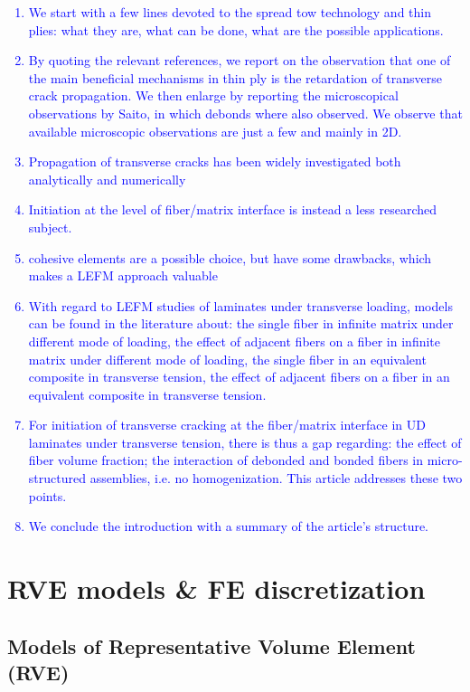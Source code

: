\documentclass[review]{elsarticle}
\begin{document}
\textcolor{blue}{
\begin{enumerate}
\item We start with a few lines devoted to the spread tow technology and thin plies: what they are, what can be done, what are the possible applications.
\item By quoting the relevant references, we report on the observation that one of the main beneficial mechanisms in thin ply is the retardation of transverse crack propagation. We then enlarge by reporting the microscopical observations by Saito, in which debonds where also observed. We observe that available microscopic observations are just a few and mainly in 2D.
\item Propagation of transverse cracks has been widely investigated both analytically and numerically
\item Initiation at the level of fiber/matrix interface is instead a less researched subject.
\item cohesive elements are a possible choice, but have some drawbacks, which makes a LEFM approach valuable
\item With regard to LEFM studies of laminates under transverse loading, models can be found in the literature about: the single fiber in infinite matrix under different mode of loading, the effect of adjacent fibers on a fiber in infinite matrix under different mode of loading, the single fiber in an equivalent composite in transverse tension, the effect of adjacent fibers on a fiber in an equivalent composite in transverse tension.
\item For initiation of transverse cracking at the fiber/matrix interface in UD laminates under transverse tension, there is thus a gap regarding: the effect of fiber volume fraction; the interaction of debonded and bonded fibers in micro-structured assemblies, i.e. no homogenization. This article addresses these two points.
\item We conclude the introduction with a summary of the article's structure.
\end{enumerate}
}

\section{RVE models \& FE discretization}

\subsection{Models of Representative Volume Element (RVE)}
\end{document}
